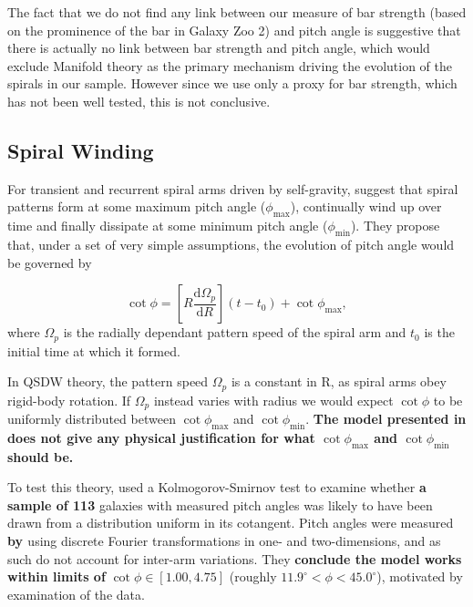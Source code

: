 The fact that we do not find any link between our measure of bar strength (based on the prominence of the bar in Galaxy Zoo 2) and pitch angle is suggestive that there is actually no link between bar strength and pitch angle, which would exclude Manifold theory as the primary mechanism driving the evolution of the spirals in our sample. However since we use only a proxy for bar strength, which has not been well tested, this is not conclusive.

\subsection{Spiral Winding}
\label{section:spiral_winding}

For transient and recurrent spiral arms driven by self-gravity, \citet{2019arXiv190910291P} suggest that spiral patterns form at some maximum pitch angle ($\phi_\mathrm{max}$), continually wind up over time and finally dissipate at some minimum pitch angle ($\phi_\mathrm{min}$). They propose that, under a set of very simple assumptions, the evolution of pitch angle would be governed by

\begin{equation}
  \label{eq:winding}
  \cot{\phi} = \left[R\frac{\mathrm{d}\Omega_p}{\mathrm{d}R}\right](t - t_0) + \cot{\phi_\mathrm{max}},
\end{equation}
where $\Omega_p$ is the radially dependant pattern speed of the spiral arm and $t_0$ is the initial time at which it formed.

In QSDW theory, the pattern speed $\Omega_p$ is a constant in R, as spiral arms obey rigid-body rotation. If $\Omega_p$ instead varies with radius we would expect $\cot{\phi}$ to be uniformly distributed between $\cot{\phi_\mathrm{max}}$ and $\cot{\phi_\mathrm{min}}$. {\bf The model presented in \citet{2019arXiv190910291P} does not give any physical justification for what $\cot{\phi_\mathrm{max}}$ and $\cot{\phi_\mathrm{min}}$ should be. }

To test this theory, \citet{2019arXiv190910291P} used a Kolmogorov-Smirnov test to examine whether {\bf a sample of 113} galaxies with measured pitch angles was likely to have been drawn from a distribution uniform in its cotangent. Pitch angles were measured {\bf by \citet{2019ApJ...871..194Y}} using discrete Fourier transformations in one- and two-dimensions, and as such do not account for inter-arm variations. They {\bf conclude the model works within limits of} $\cot{\phi} \in [1.00, 4.75]$ (roughly $11.9^\circ < \phi < 45.0^\circ$), motivated by examination of the data.

